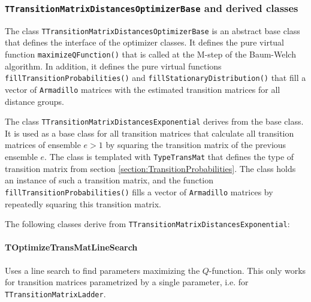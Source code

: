 \documentclass[a4paper,11pt]{article}
\def\armadillo{\texttt{Armadillo}}
\newcommand{\class}[1]{\texttt{#1}}
\newcommand{\privfunc}[1]{\texttt{\textunderscore#1()}}
\newcommand{\pubfunc}[1]{\texttt{#1()}}
\newcommand{\template}[1]{\texttt{#1}}
\begin{document}
\subsubsection{\class{TTransitionMatrixDistancesOptimizerBase} and derived classes}

The class \class{TTransitionMatrixDistancesOptimizerBase} is an abstract base class that defines the interface of the optimizer classes. It defines the pure virtual function \pubfunc{maximizeQFunction} that is called at the M-step of the Baum-Welch algorithm. In addition, it defines the pure virtual functions \privfunc{fillTransitionProbabilities} and \privfunc{fillStationaryDistribution} that fill a vector of \armadillo{} matrices with the estimated transition matrices for all distance groups.

The class \class{TTransitionMatrixDistancesExponential} derives from the base class. It is used as a base class for all transition matrices that calculate all transition matrices of ensemble $e > 1$ by squaring the transition matrix of the previous ensemble $e$. The class is templated with \template{TypeTransMat} that defines the type of transition matrix from section \ref{section:TransitionProbabilities}. The class holds an instance of such a transition matrix, and the function \privfunc{fillTransitionProbabilities} fills a vector of \armadillo{} matrices by repeatedly squaring this transition matrix.

The following classes derive from \class{TTransitionMatrixDistancesExponential}:

\paragraph{TOptimizeTransMatLineSearch} Uses a line search to find parameters maximizing the $Q$-function. This only works for transition matrices parametrized by a single parameter, i.e. for \class{TTransitionMatrixLadder}.
\end{document}
